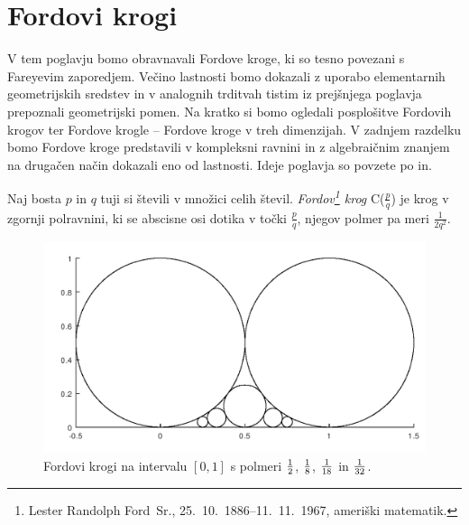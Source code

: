\documentclass[mat1]{fmfdelo}
\begin{document}
%
\section{Fordovi krogi}

V tem poglavju bomo obravnavali Fordove kroge, ki so tesno povezani s Fareyevim zaporedjem. Večino lastnosti bomo dokazali z uporabo elementarnih geometrijskih sredstev in v analognih trditvah tistim iz prejšnjega poglavja prepoznali geometrijski pomen. Na kratko si bomo ogledali posplošitve Fordovih krogov ter Fordove krogle -- Fordove kroge v treh dimenzijah. V zadnjem razdelku bomo Fordove kroge predstavili v kompleksni ravnini in z algebraičnim znanjem na drugačen način dokazali eno od lastnosti.
Ideje poglavja so povzete po \cite[poglavje 4]{fareyproject} in\cite{ford}.

\begin{definicija}
Naj bosta $p$ in $q$ tuji si števili v množici celih števil.
\emph{Fordov\footnote{Lester Randolph Ford~Sr., 25.\ 10.\ 1886--11.\ 11.\ 1967, ameriški matematik.} krog} C($\frac{p}{q}$) je krog v zgornji polravnini, ki se abscisne osi dotika v točki $\frac{p}{q}$, njegov polmer pa meri $\frac{1}{2q^2}$. 
\end{definicija}

\begin{figure}[h!]
\begin{center}
\includegraphics[scale=0.5]{fordovi_krogi.png}
\caption{Fordovi krogi na intervalu $[0,1]$ s polmeri $\protect{\frac{1}{2}}$, $\protect{\frac{1}{8}}$, $\protect{\frac{1}{18}}$ in $\protect{\frac{1}{32}}$.}
\end{center}
\end{figure}
\end{document}
